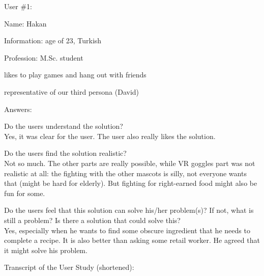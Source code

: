 \documentclass[a4paper,10pt,oneside]{scrreprt}
\begin{document}
User \#1:
\begin{compactitem}
	\item Name: Hakan
	\item Information: age of 23, Turkish
	\item Profession: M.Sc. student
	\item likes to  play games and hang out with friends
	\item representative of our third persona (David)
\end{compactitem}
\bigskip

Answers:
\begin{compactitem}
	\item Do the users understand the solution?\\
		Yes, it was clear for the user. The user also really likes the solution.\\
	
	\item Do the users find the solution realistic?\\
		Not so much. The other parts are really possible, while VR goggles part was not realistic at all: the fighting with the other mascots is silly, not everyone wants that (might be hard for elderly). But fighting for right-earned food might also be fun for some.\\
		
	\item Do the users feel that this solution can solve his/her problem(s)? If not, what is still
	a problem? Is there a solution that could solve this?\\
		Yes, especially when he wants to find some obscure ingredient that he needs to complete a recipe. It is also better than asking some retail worker. He agreed that it might solve his problem.
\end{compactitem}
\bigskip

Transcript of the User Study (shortened):\\
\end{document}
